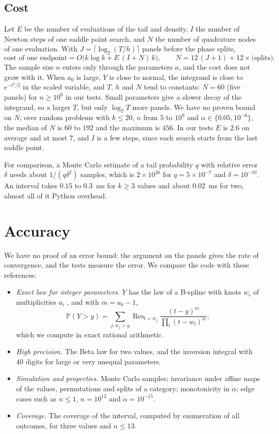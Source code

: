 \documentclass[11pt]{article}
\newcommand{\Pp}{\mathbb{P}}
\begin{document}
\subsection{Cost}\label{sec:cost}

Let $E$ be the number of evaluations of the tail and density, $I$ the number of Newton steps of one saddle point search, and $N$ the number of quadrature nodes of one evaluation.
With $J = \lceil \log_2(T/h) \rceil$ panels before the phase splits,
\[
  \text{cost of one endpoint} = O\bigl(k\log k + E\,(I + N)\,k\bigr), \qquad N = 12\,(J + 1) + 12 \times \text{(splits)} .
\]
The sample size $n$ enters only through the parameters $a$, and the cost does not grow with it.
When $a_0$ is large, $Y$ is close to normal, the integrand is close to $e^{-t^2/2}$ in the scaled variable, and $T$, $h$ and $N$ tend to constants: $N = 60$ (five panels) for $n \ge 10^6$ in our tests.
Small parameters give a slower decay of the integrand, so a larger $T$, but only $\log_2 T$ more panels.
We have no proven bound on $N$; over random problems with $k \le 20$, $n$ from $5$ to $10^9$ and $\alpha \in \{0.05, 10^{-6}\}$, the median of $N$ is $60$ to $192$ and the maximum is $456$.
In our tests $E$ is $2.6$ on average and at most $7$, and $I$ is a few steps, since each search starts from the last saddle point.

For comparison, a Monte Carlo estimate of a tail probability $q$ with relative error $\delta$ needs about $1/(q\delta^2)$ samples, which is $2 \times 10^{26}$ for $q = 5 \times 10^{-7}$ and $\delta = 10^{-10}$.
An interval takes $0.15$ to $0.3$~ms for $k \ge 3$ values and about $0.02$~ms for two, almost all of it Python overhead.

\section{Accuracy}\label{sec:tests}

We have no proof of an error bound: the argument on the panels gives the rate of convergence, and the tests measure the error.
We compare the code with these references:
\begin{itemize}[nosep]
  \item \emph{Exact law for integer parameters.} $Y$ has the law of a B-spline with knots $w_i$ of multiplicities $a_i$ \cite{curry1966}, and with $m = a_0 - 1$,
  \[
    \Pp(Y > y) = \sum_{j : w_j > y} \operatorname{Res}_{t = w_j} \frac{(t - y)^m}{\prod_l (t - w_l)^{a_l}},
  \]
  which we compute in exact rational arithmetic.
  \item \emph{High precision.} The Beta law for two values, and the inversion integral with 40 digits for large or very unequal parameters.
  \item \emph{Simulation and properties.} Monte Carlo samples; invariance under affine maps of the values, permutations and splits of a category; monotonicity in $\alpha$; edge cases such as $n \le 1$, $n = 10^{12}$ and $\alpha = 10^{-15}$.
  \item \emph{Coverage.} The coverage of the interval, computed by enumeration of all outcomes, for three values and $n \le 13$.
\end{itemize}
\end{document}
